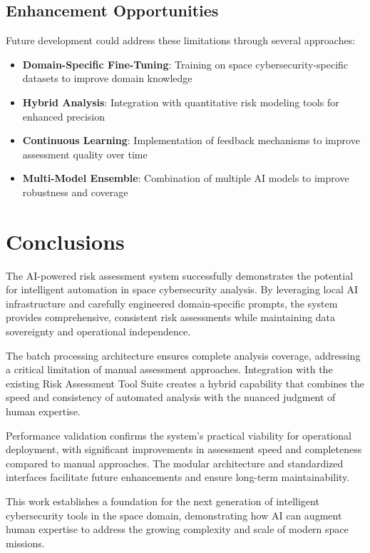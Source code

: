 \documentclass[binding=0.6cm]{sapthesis}
\begin{document}
\subsection{Enhancement Opportunities}

Future development could address these limitations through several approaches:

\begin{itemize}
    \item \textbf{Domain-Specific Fine-Tuning}: Training on space cybersecurity-specific datasets to improve domain knowledge
    \item \textbf{Hybrid Analysis}: Integration with quantitative risk modeling tools for enhanced precision
    \item \textbf{Continuous Learning}: Implementation of feedback mechanisms to improve assessment quality over time
    \item \textbf{Multi-Model Ensemble}: Combination of multiple AI models to improve robustness and coverage
\end{itemize}

\section{Conclusions}

The AI-powered risk assessment system successfully demonstrates the potential for intelligent automation in space cybersecurity analysis. By leveraging local AI infrastructure and carefully engineered domain-specific prompts, the system provides comprehensive, consistent risk assessments while maintaining data sovereignty and operational independence.

The batch processing architecture ensures complete analysis coverage, addressing a critical limitation of manual assessment approaches. Integration with the existing Risk Assessment Tool Suite creates a hybrid capability that combines the speed and consistency of automated analysis with the nuanced judgment of human expertise.

Performance validation confirms the system's practical viability for operational deployment, with significant improvements in assessment speed and completeness compared to manual approaches. The modular architecture and standardized interfaces facilitate future enhancements and ensure long-term maintainability.

This work establishes a foundation for the next generation of intelligent cybersecurity tools in the space domain, demonstrating how AI can augment human expertise to address the growing complexity and scale of modern space missions.
\end{document}
